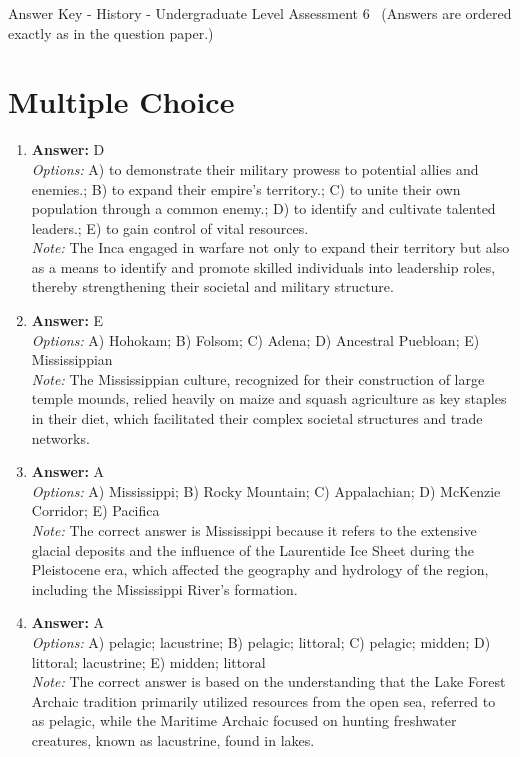 \documentclass[12pt]{article}
\begin{document}
\begin{center}
Answer Key - History - Undergraduate Level Assessment 6 \
\small (Answers are ordered exactly as in the question paper.)
\end{center}

\section*{Multiple Choice}
\begin{enumerate}[label=\arabic*.]
\item \textbf{Answer:} D
\\ \textit{Options:} A) to demonstrate their military prowess to potential allies and enemies.; B) to expand their empire's territory.; C) to unite their own population through a common enemy.; D) to identify and cultivate talented leaders.; E) to gain control of vital resources.
\\ \textit{Note:} The Inca engaged in warfare not only to expand their territory but also as a means to identify and promote skilled individuals into leadership roles, thereby strengthening their societal and military structure.
\item \textbf{Answer:} E
\\ \textit{Options:} A) Hohokam; B) Folsom; C) Adena; D) Ancestral Puebloan; E) Mississippian
\\ \textit{Note:} The Mississippian culture, recognized for their construction of large temple mounds, relied heavily on maize and squash agriculture as key staples in their diet, which facilitated their complex societal structures and trade networks.
\item \textbf{Answer:} A
\\ \textit{Options:} A) Mississippi; B) Rocky Mountain; C) Appalachian; D) McKenzie Corridor; E) Pacifica
\\ \textit{Note:} The correct answer is Mississippi because it refers to the extensive glacial deposits and the influence of the Laurentide Ice Sheet during the Pleistocene era, which affected the geography and hydrology of the region, including the Mississippi River's formation.
\item \textbf{Answer:} A
\\ \textit{Options:} A) pelagic; lacustrine; B) pelagic; littoral; C) pelagic; midden; D) littoral; lacustrine; E) midden; littoral
\\ \textit{Note:} The correct answer is based on the understanding that the Lake Forest Archaic tradition primarily utilized resources from the open sea, referred to as pelagic, while the Maritime Archaic focused on hunting freshwater creatures, known as lacustrine, found in lakes.

\end{enumerate}
\end{document}
